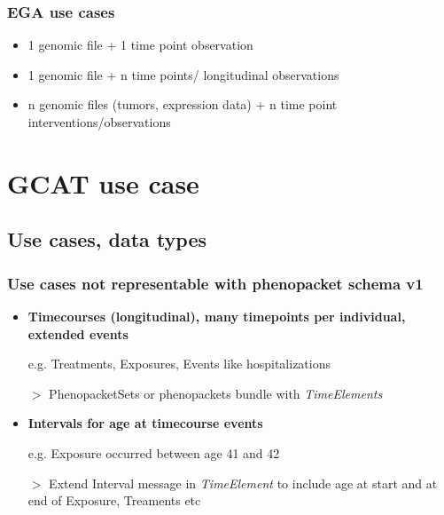 \documentclass{beamer}
\begin{document}
\begin{frame}
\frametitle{EGA use cases}
\begin{itemize}


\item 1 genomic file + 1 time point observation
\item 1 genomic file + n time points/ longitudinal observations
\item n genomic files (tumors, expression data) + n time point interventions/observations 


\end{itemize}
\end{frame}

\section{GCAT use case} %


\subsection{Use cases, data types} %

\begin{frame}
\frametitle{Use cases not representable with phenopacket schema v1}
\begin{itemize}

\item \textbf{Timecourses (longitudinal), many timepoints per individual, extended events}
\begin{block}{}
e.g. Treatments, Exposures, Events like hospitalizations
\end{block}
\item[$>$] PhenopacketSets or phenopackets bundle with \textit{TimeElements} \\

\item \textbf{Intervals for age at timecourse events}
\begin{block}{}
e.g. Exposure occurred between age 41 and 42
\end{block}
\item[$>$] Extend Interval message in \textit{TimeElement} to include age at start and at end of Exposure, Treaments etc

\end{itemize}
\end{frame}
\end{document}
